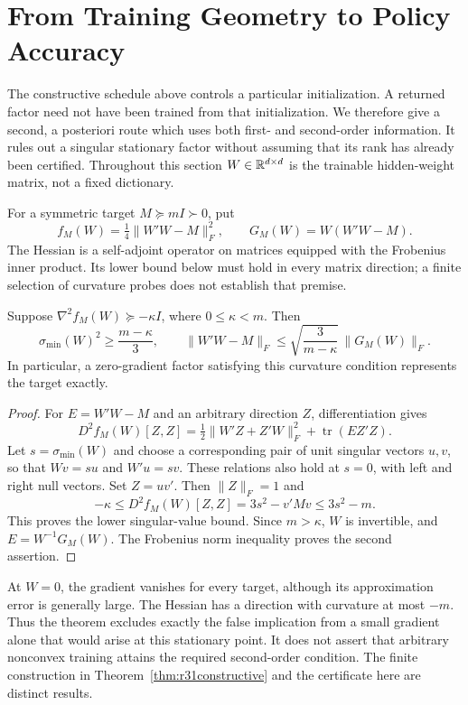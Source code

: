 \section{From Training Geometry to Policy Accuracy}\label{sec:r32geometry}
The constructive schedule above controls a particular initialization. A returned
factor need not have been trained from that initialization. We therefore give
a second, a posteriori route which uses both first- and second-order information.
It rules out a singular stationary factor without assuming that its rank has
already been certified. Throughout this section $W\in\mathbb R^{d\times d}$ is the
trainable hidden-weight matrix, not a fixed dictionary.

For a symmetric target $M\succeq mI\succ0$, put
\[
 f_M(W)=\tfrac14\|W'W-M\|_F^2,\qquad G_M(W)=W(W'W-M).
\]
The Hessian is a self-adjoint operator on matrices equipped with the Frobenius
inner product. Its lower bound below must hold in every matrix direction;
a finite selection of curvature probes does not establish that premise.

\begin{theorem}\label{thm:r32geometry}
Suppose $\nabla^2 f_M(W)\succeq-\kappa I$, where $0\leq\kappa<m$.
Then
\begin{equation}\label{eq:r32geometry}
 \sigma_{\min}(W)^2\geq\frac{m-\kappa}{3},\qquad
 \|W'W-M\|_F\leq
       \sqrt{\frac{3}{m-\kappa}}\,\|G_M(W)\|_F.
\end{equation}
In particular, a zero-gradient factor satisfying this curvature condition
represents the target exactly.
\end{theorem}
\begin{proof}
For $E=W'W-M$ and an arbitrary direction $Z$, differentiation gives
\[
 D^2f_M(W)[Z,Z]
   =\tfrac12\|W'Z+Z'W\|_F^2+\operatorname{tr}(E Z'Z).
\]
Let $s=\sigma_{\min}(W)$ and choose a corresponding pair of unit singular
vectors $u,v$, so that $Wv=su$ and $W'u=sv$. These relations also hold at
$s=0$, with left and right null vectors. Set $Z=uv'$. Then $\|Z\|_F=1$ and
\[
 -\kappa\leq D^2f_M(W)[Z,Z]=3s^2-v'Mv\leq3s^2-m.
\]
This proves the lower singular-value bound. Since $m>\kappa$, $W$ is
invertible, and $E=W^{-1}G_M(W)$. The Frobenius norm inequality proves the
second assertion.
\end{proof}

At $W=0$, the gradient vanishes for every target, although its approximation
error is generally large. The Hessian has a direction with curvature at most
$-m$. Thus the theorem excludes exactly the false implication from a small
gradient alone that would arise at this stationary point. It does not assert
that arbitrary nonconvex training attains the required second-order condition.
The finite construction in Theorem~\ref{thm:r31constructive} and the
certificate here are distinct results.

